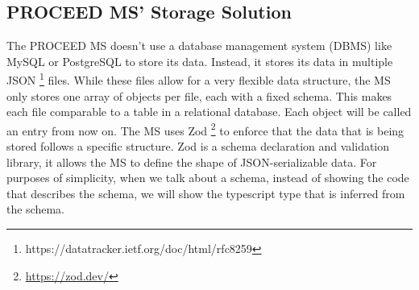 %
%
%
%

\subsection{PROCEED MS' Storage Solution}
\label{cha:relatedwork:proceed-storage}

The PROCEED MS doesn't use a database management system (DBMS) like MySQL or PostgreSQL to store its data.
Instead, it stores its data in multiple
JSON \footnote{https://datatracker.ietf.org/doc/html/rfc8259} files.
While these files allow for a very flexible data structure, the MS only stores one array of
objects per file,
each with a fixed schema.
This makes each file comparable to a table in a relational database.
Each object will be called an entry from now on.
The MS uses Zod \footnote{\url{https://zod.dev/}} to enforce that the data that is being
stored follows a specific structure. 
Zod is a schema declaration and validation library, it allows the MS to define the shape
of JSON-serializable data.
For purposes of simplicity, when we talk about a schema, instead of showing the code that
describes the schema, we will show the typescript type that is inferred from the schema.

